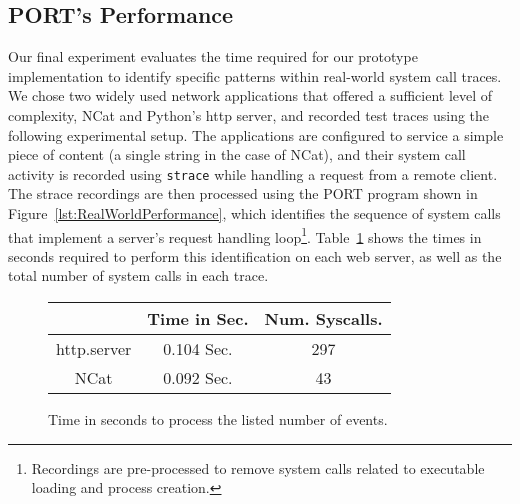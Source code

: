 \subsection{PORT's Performance}

Our final experiment evaluates the
time required for our prototype implementation
to identify specific
patterns within real-world system call traces.
We chose two widely used network applications that offered a sufficient level of complexity,
NCat
and
Python's http server,
and recorded test traces using the following 
experimental setup.  The applications are configured to service
a simple piece of content (a single string in the case of NCat), and their system call activity is
recorded using {\tt strace} while handling a request from a remote client.
The strace recordings are then processed using the PORT program shown in
Figure~\ref{lst:RealWorldPerformance},  which
identifies the sequence of system calls that implement
a server's request handling loop\footnote{Recordings are pre-processed to remove system calls
related to executable loading and process creation.}.  Table~\ref{tbl:RealWorldPerformance}
shows the times in seconds required to perform this identification on each
web server, as well as the total number of system calls in each trace.

\begin{figure}
\centering
  \begin{tabular}{|c|c|c}
                & Time in Sec. & Num. Syscalls.\\
              \hline
  http.server   & 0.104 Sec.   & 297   \\
  NCat          & 0.092 Sec.   & 43      \\
\end{tabular}
\caption{Time in seconds to process the listed number of events.}
\label{tbl:RealWorldPerformance}
\end{figure}

%


